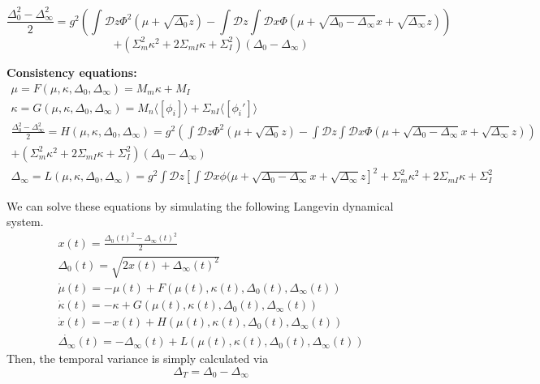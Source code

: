\documentclass[11pt]{article}
\begin{document}
\[\frac{\Delta_0^2-\Delta_\infty^2}{2} = g^2 \left( \int \mathcal{D}z \Phi^2(\mu + \sqrt{\Delta_0}z) - \int \mathcal{D}z \int \mathcal{D}x \Phi(\mu + \sqrt{\Delta_0 - \Delta_\infty}x + \sqrt{\Delta_\infty}z)  \right) \] 
\[+ (\Sigma_m^2 \kappa^2 + 2\Sigma_{mI} \kappa + \Sigma_I^2)(\Delta_0-\Delta_\infty)\]

\textbf{Consistency equations:} \\ 
\begin{equation}
\begin{split}
\mu = F(\mu, \kappa, \Delta_0, \Delta_\infty) = M_m \kappa + M_I \\
\kappa = G(\mu, \kappa, \Delta_0, \Delta_\infty) = M_n \langle \left[ \phi_i \right] \rangle + \Sigma_{nI} \langle \left[ \phi_i' \right] \rangle \\
\frac{\Delta_0^2-\Delta_\infty^2}{2} = H(\mu, \kappa, \Delta_0, \Delta_\infty) = g^2 \left( \int \mathcal{D}z \Phi^2(\mu + \sqrt{\Delta_0}z) - \int \mathcal{D}z \int \mathcal{D}x \Phi(\mu + \sqrt{\Delta_0 - \Delta_\infty}x + \sqrt{\Delta_\infty}z)  \right) \\
+ (\Sigma_m^2 \kappa^2 + 2\Sigma_{mI} \kappa + \Sigma_I^2)(\Delta_0-\Delta_\infty) \\
\Delta_\infty = L(\mu, \kappa, \Delta_0, \Delta_\infty)  = g^2 \int \mathcal{D}z \left[ \int \mathcal{D}x \phi(\mu + \sqrt{\Delta_0 - \Delta_\infty}x + \sqrt{\Delta_\infty}z \right]^2 + \Sigma_m^2 \kappa^2 + 2\Sigma_{mI} \kappa + \Sigma_I^2
\end{split} 
\end{equation}

We can solve these equations by simulating the following Langevin dynamical system.
\begin{equation}
\begin{split}
x(t) = \frac{\Delta_0(t)^2-\Delta_\infty(t)^2}{2} \\
\Delta_0(t) = \sqrt{2x(t) + \Delta_\infty(t)^2} \\
\dot{\mu}(t) = -\mu(t) + F(\mu(t), \kappa(t), \Delta_0(t), \Delta_\infty(t)) \\
\dot{\kappa}(t) = -\kappa + G(\mu(t), \kappa(t), \Delta_0(t), \Delta_\infty(t)) \\
\dot{x}(t) = -x(t) + H(\mu(t), \kappa(t), \Delta_0(t), \Delta_\infty(t)) \\
\dot{\Delta_\infty}(t) = -\Delta_\infty(t) + L(\mu(t), \kappa(t), \Delta_0(t), \Delta_\infty(t))
\end{split}
\end{equation}
Then, the temporal variance is simply calculated via
\begin{equation}
\Delta_T = \Delta_0 - \Delta_\infty
\end{equation}
\end{document}
